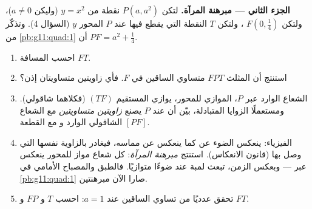 \begin{problem}
\medskip
\noindent\textbf{الجزء الثاني --- مبرهنة المرآة.}
لتكن $P(a, a^2)$ نقطة من  $y = x^2$ (وليكن
$a \neq 0$)، ولتكن $F\left(0, \frac14\right)$ ، ولتكن $T$
النقطة التي يقطع فيها  عند $P$ المحور $y$ (السؤال
4). وتذكّر من \cref{pb:g11:quad:1} أن
$PF = a^2 + \frac14$.
\begin{enumerate}[resume]
  \item احسب المسافة $FT$.
  \item استنتج أن المثلث $FPT$ متساوي الساقين في $F$.
        فأي زاويتين متساويتان إذن؟
  \item الشعاع الوارد عبر $P$، الموازي للمحور،
        يوازي المستقيم $(TF)$ (فكلاهما شاقولي). ومستعملًا
        الزوايا المتبادلة، بيّن أن  عند $P$ يصنع
        \emph{زاويتين متساويتين} مع الشعاع الشاقولي الوارد و
        مع القطعة $[PF]$.
  \item الفيزياء: ينعكس الضوء عن  كما ينعكس عن مماسه،
        فيغادر بالزاوية نفسها التي وصل بها (قانون
        الانعكاس). استنتج \emph{مبرهنة المرآة}: كل
        شعاع مواز للمحور ينعكس عبر  ---
        وبعكس الزمن، تبعث لمبة عند  ضوءًا
        متوازيًا. فالطبق والمصباح الأمامي في
        \cref{pb:g11:quad:1} صارا الآن مبرهنتين.
  \item تحقق عدديًا من تساوي الساقين عند $a = 1$:
        احسب $T$ و $FP$ و $FT$.
\end{enumerate}


\end{problem}
